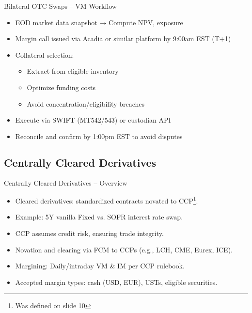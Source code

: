 \documentclass[handout, aspectratio=169]{beamer}
\begin{document}
\begin{frame}{Bilateral OTC Swaps – VM Workflow}
  \begin{itemize}
    \item EOD market data snapshot → Compute NPV, exposure
    \item Margin call issued via Acadia or similar platform by 9:00am EST (T+1)
    \item Collateral selection:
    \begin{itemize}
      \item Extract from eligible inventory
      \item Optimize funding costs
      \item Avoid concentration/eligibility breaches
    \end{itemize}
    \item Execute via SWIFT (MT542/543) or custodian API
    \item Reconcile and confirm by 1:00pm EST to avoid disputes
  \end{itemize}
\end{frame}

\subsection{Centrally Cleared Derivatives}
\begin{frame}{Centrally Cleared Derivatives – Overview}
  \begin{itemize}
    \item Cleared derivatives: standardized contracts novated to CCP\footnote{Was defined on slide 10}.
    \item Example: 5Y vanilla Fixed vs. SOFR interest rate swap.
    \item CCP assumes credit risk, ensuring trade integrity.
    \item Novation and clearing via FCM to CCPs (e.g., LCH, CME, Eurex, ICE).
    \item Margining: Daily/intraday VM \& IM per CCP rulebook.
    \item Accepted margin types: cash (USD, EUR), USTs, eligible securities.
  \end{itemize}
\end{frame}
\end{document}
